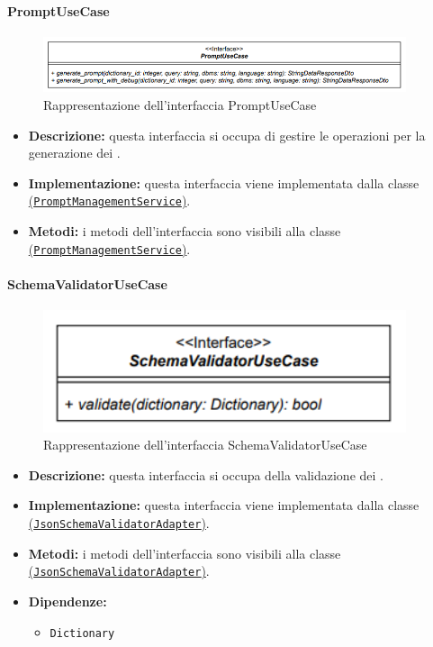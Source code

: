 \paragraph{PromptUseCase} \label{PromptUseCase}
\begin{figure}[H]
    \centering
    \includegraphics[width=0.95\textwidth]{assets/Backend/prompt_use_case.png}
    \caption{Rappresentazione dell'interfaccia PromptUseCase}
  \end{figure}
\begin{itemize}
    \item \textbf{Descrizione:} questa interfaccia si occupa di gestire le operazioni per la generazione dei .
    \item \textbf{Implementazione:} questa interfaccia viene implementata dalla classe \hyperref[PromptManagementService]{(\texttt{PromptManagementService})}.
    \item \textbf{Metodi:} i metodi dell'interfaccia sono visibili alla classe \hyperref[PromptManagementService]{(\texttt{PromptManagementService})}.
\end{itemize}  

\paragraph{SchemaValidatorUseCase} \label{SchemaValidatorUseCase}
\begin{figure}[H]
    \centering
    \includegraphics[width=0.95\textwidth]{assets/Backend/schema_validator_use_case.png}
    \caption{Rappresentazione dell'interfaccia SchemaValidatorUseCase}
  \end{figure}
\begin{itemize}
    \item \textbf{Descrizione:} questa interfaccia si occupa della validazione dei .
    \item \textbf{Implementazione:} questa interfaccia viene implementata dalla classe \hyperref[JsonSchemaValidatorAdapter]{(\texttt{JsonSchemaValidatorAdapter})}.
    \item \textbf{Metodi:} i metodi dell'interfaccia sono visibili alla classe \hyperref[JsonSchemaValidatorAdapter]{(\texttt{JsonSchemaValidatorAdapter})}.
    \item \textbf{Dipendenze:}
    \begin{itemize}
        \item \texttt{Dictionary}
    \end{itemize}
\end{itemize}  

